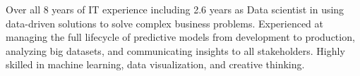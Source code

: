 
\begin{cvparagraph}

Over all 8 years of IT experience including 2.6 years as Data scientist in using data-driven solutions to solve complex business problems. Experienced at managing the full lifecycle of predictive models from development to production, analyzing big datasets, and communicating insights to all stakeholders. Highly skilled in machine learning, data visualization, and creative thinking.
\end{cvparagraph}
